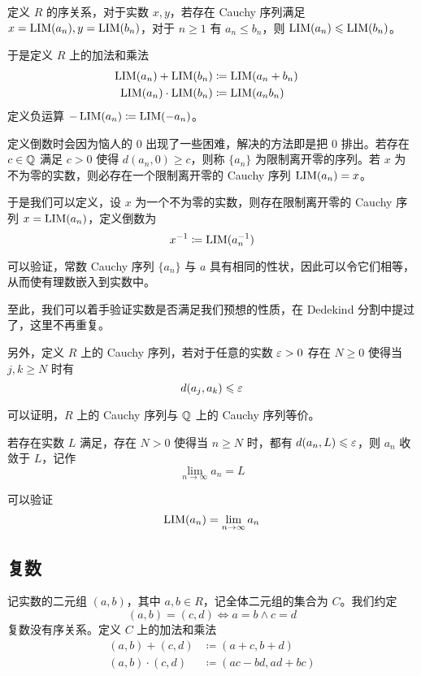 定义 $R$ 的序关系，对于实数 $x,y$，若存在 Cauchy 序列满足 $x=\operatorname{{LIM}}(a_n),y=\operatorname{{LIM}}(b_n)$，对于 $n\geqslant 1$ 有 $a_n \leqslant b_n$，则 $\operatorname{{LIM}}(a_n) \leqslant \operatorname{{LIM}}(b_n)$。

于是定义 $R$ 上的加法和乘法
\begin{equation*}
	\begin{aligned}
		\operatorname{{LIM}}(a_n) + \operatorname{{LIM}}(b_n) &\coloneqq  \operatorname{{LIM}}(a_n+b_n)&\\
		\operatorname{{LIM}}(a_n) \cdot \operatorname{{LIM}}(b_n) &\coloneqq  \operatorname{{LIM}}(a_nb_n)\\
	\end{aligned}
\end{equation*}
定义负运算 $-\operatorname{{LIM}}(a_n) \coloneqq  \operatorname{{LIM}}(-a_n)$。

定义倒数时会因为恼人的 $0$ 出现了一些困难，解决的方法即是把 $0$ 排出。若存在 $c\in \mathbb{Q}$ 满足 $c > 0$ 使得 $d(a_n,0) \geqslant c$，则称 $\{a_n\}$ 为限制离开零的序列。若 $x$ 为不为零的实数，则必存在一个限制离开零的 Cauchy 序列 $\operatorname{{LIM}}(a_n) = x$。

于是我们可以定义，设 $x$ 为一个不为零的实数，则存在限制离开零的 Cauchy 序列 $x=\operatorname{{LIM}}(a_n)$，定义倒数为
$$x^{-1} \coloneqq  \operatorname{{LIM}}(a_n^{-1})$$

可以验证，常数 Cauchy 序列 $\{a_n\}$ 与 $a$ 具有相同的性状，因此可以令它们相等，从而使有理数嵌入到实数中。

至此，我们可以着手验证实数是否满足我们预想的性质，在 Dedekind 分割中提过了，这里不再重复。

另外，定义 $R$ 上的 Cauchy 序列，若对于任意的实数 $\varepsilon > 0$ 存在 $N \geqslant 0$ 使得当 $j,k \geqslant N$ 时有 
$$d(a_j,a_k) \leqslant \varepsilon$$

可以证明，$R$ 上的 Cauchy 序列与 $\mathbb{Q}$ 上的 Cauchy 序列等价。

若存在实数 $L$ 满足，存在 $N>0$ 使得当 $n \geqslant N$ 时，都有 $d(a_n,L) \leqslant \varepsilon$，则 $a_n$ 收敛于 $L$，记作
$$\lim_{n\to \infty} a_n = L$$

可以验证
$$\operatorname{{LIM}}(a_n) = \lim_{n\to \infty} a_n$$

\subsection{复数}

记实数的二元组 $(a,b)$，其中 $a,b\in R$，记全体二元组的集合为 $C$。我们约定
\[(a,b) = (c,d) \Leftrightarrow a=b \land  c=d\]
复数没有序关系。定义 $C$ 上的加法和乘法
\[\begin{aligned}
		(a,b) + (c,d) &\coloneqq  (a+c,b+d)\\
		(a,b) \cdot (c,d) &\coloneqq  (ac-bd,ad+bc)
\end{aligned}\]


